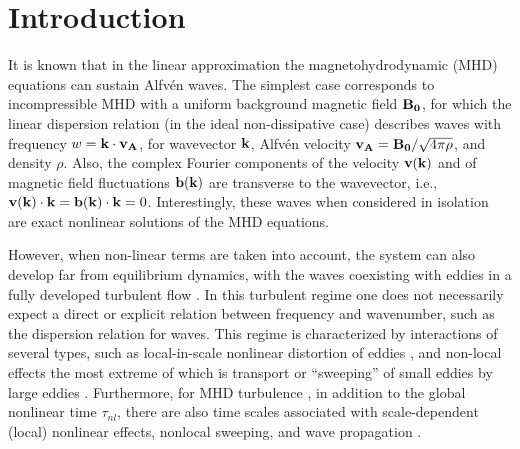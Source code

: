 \documentclass[aip,pop,reprint,amsmath,amssymb,floatfix]{revtex4-1}
\begin{document}
\section{Introduction}\label{sec_Intro}
 
It is known that in the linear approximation the magnetohydrodynamic
(MHD) equations can sustain Alfv\'en waves. The simplest case
corresponds to incompressible MHD with a uniform background magnetic
field ${\bf B_0}$, for which the linear dispersion relation (in the
ideal non-dissipative case) describes waves with frequency $w={\bf k}
\cdot {\bf v_A}$, for wavevector ${\bf k}$, Alfv\'en velocity ${\bf
  v_A}={\bf B_0}/\sqrt{4\pi \rho}$, and density $\rho$. Also, the
complex Fourier components of the velocity ${\bf v}({\bf k})$ and of
magnetic field fluctuations ${\bf b}({\bf k})$ are transverse to the
wavevector, i.e., ${\bf v}({\bf k}) \cdot {\bf k} = {\bf b}({\bf k})
\cdot {\bf k}=0$. Interestingly, these waves when considered in
isolation are exact nonlinear solutions of the MHD equations.

However, when non-linear terms are taken into account, the system can
also develop far from equilibrium dynamics, with the waves coexisting
with eddies in a fully developed turbulent flow
\cite{dmitruk_waves_2009}. In this turbulent regime one does not
necessarily expect a direct or explicit relation between frequency and
wavenumber, such as the dispersion relation for waves. This regime is
characterized by interactions of several types, such as local-in-scale
nonlinear distortion of eddies \cite{monin_statistical_2013,
  kolmogorov_local_1941, mccomb_physics_1992}, and non-local effects
\cite{alexakis_turbulent_2007, alexakis_anisotropic_2007,
  teaca_energy_2009, mininni_scale_2011} the most extreme of which is
transport or ``sweeping'' of small eddies by large eddies
\cite{kraichnan_structure_1959, tennekes_eulerian_1975,
  chen_sweeping_1989, nelkin_time_1990}. Furthermore, for MHD
turbulence \cite{pouquet_strong_1976, zhou_magnetohydrodynamic_2004},
in addition to the global nonlinear time $\tau_{nl}$, there are also
time scales associated with scale-dependent (local) nonlinear effects,
nonlocal sweeping, and wave propagation
\cite{zhou_magnetohydrodynamic_2004}.
\end{document}
